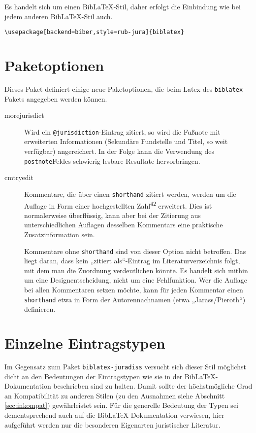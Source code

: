 \documentclass[11pt,a4paper,DIV=calc]{scrartcl}
\newcommand\software[1]{\textsf{#1}}
\newcommand\Biblatex{\software{Bib\LaTeX{}}\xspace}
\begin{document}
Es handelt sich um einen \Biblatex-Stil, daher erfolgt die Einbindung
wie bei jedem anderen \Biblatex-Stil auch.

\begin{verbatim}
\usepackage[backend=biber,style=rub-jura]{biblatex}
\end{verbatim}

\section{Paketoptionen}

Dieses Paket definiert einige neue Paketoptionen, die beim Latex des
\verb+biblatex+-Pakets angegeben werden können.

\begin{description}
\item[morejurisdict] Wird ein \verb+@jurisdiction+-Eintrag zitiert, so
  wird die Fußnote mit erweiterten Informationen (Sekundäre Fundstelle
  und Titel, so weit verfügbar) angereichert. In der Folge kann die
  Verwendung des \verb+postnote+Feldes schwierig lesbare Resultate
  hervorbringen.
\item[cmtryedit] Kommentare, die über einen \verb+shorthand+ zitiert
  werden, werden um die Auflage in Form einer hochgestellten
  Zahl\textsuperscript{42} erweitert. Dies ist normalerweise
  überflüssig, kann aber bei der Zitierung aus unterschiedlichen
  Auflagen desselben Kommentars eine praktische Zusatzinformation
  sein.

  Kommentare ohne \verb+shorthand+ sind von dieser Option nicht
  betroffen. Das liegt daran, dass kein „zitiert als“-Eintrag im
  Literaturverzeichnis folgt, mit dem man die Zuordnung verdeutlichen
  könnte. Es handelt sich mithin um eine Designentscheidung, nicht um
  eine Fehlfunktion. Wer die Auflage bei allen Kommentaren setzen
  möchte, kann für jeden Kommentar einen \verb+shorthand+ etwa in Form
  der Autorennachnamen (etwa „Jarass/Pieroth“) definieren.
\end{description}

\section{Einzelne Eintragstypen}

Im Gegensatz zum Paket \verb+biblatex-juradiss+ versucht sich dieser
Stil möglichst dicht an den Bedeutungen der Eintragstypen wie sie in
der \Biblatex-Do\-ku\-men\-ta\-tion beschrieben sind zu halten. Damit sollte
der höchstmögliche Grad an Kompatibilität zu anderen Stilen (zu den
Ausnahmen siehe Abschnitt \ref{sec:inkompat}) gewährleistet sein. Für
die generelle Bedeutung der Typen sei dementsprechend auch auf die
\Biblatex-Do\-ku\-men\-ta\-tion verwiesen, hier aufgeführt werden nur die
besonderen Eigenarten juristischer Literatur.
\end{document}
